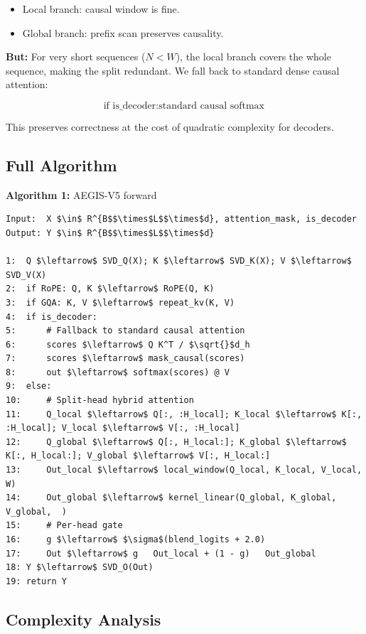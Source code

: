 \begin{itemize}
\item Local branch: causal window is fine.
\item Global branch: prefix scan preserves causality.

\end{itemize}
\textbf{But:} For very short sequences ($N < W$), the local branch covers the 
whole sequence, making the split redundant. We fall back to standard dense 
causal attention:

\begin{equation}
\text{if } \text{is\_decoder} : \text{standard causal softmax}
\end{equation}

This preserves correctness at the cost of quadratic complexity for decoders.

\subsection{Full Algorithm}

\textbf{Algorithm 1:} AEGIS-V5 forward
\begin{lstlisting}
Input:  X $\in$ R^{B$$\times$L$$\times$d}, attention_mask, is_decoder
Output: Y $\in$ R^{B$$\times$L$$\times$d}

1:  Q $\leftarrow$ SVD_Q(X); K $\leftarrow$ SVD_K(X); V $\leftarrow$ SVD_V(X)
2:  if RoPE: Q, K $\leftarrow$ RoPE(Q, K)
3:  if GQA: K, V $\leftarrow$ repeat_kv(K, V)
4:  if is_decoder:
5:      # Fallback to standard causal attention
6:      scores $\leftarrow$ Q K^T / $\sqrt{}$d_h
7:      scores $\leftarrow$ mask_causal(scores)
8:      out $\leftarrow$ softmax(scores) @ V
9:  else:
10:     # Split-head hybrid attention
11:     Q_local $\leftarrow$ Q[:, :H_local]; K_local $\leftarrow$ K[:, :H_local]; V_local $\leftarrow$ V[:, :H_local]
12:     Q_global $\leftarrow$ Q[:, H_local:]; K_global $\leftarrow$ K[:, H_local:]; V_global $\leftarrow$ V[:, H_local:]
13:     Out_local $\leftarrow$ local_window(Q_local, K_local, V_local, W)
14:     Out_global $\leftarrow$ kernel_linear(Q_global, K_global, V_global,  )
15:     # Per-head gate
16:     g $\leftarrow$ $\sigma$(blend_logits + 2.0)
17:     Out $\leftarrow$ g   Out_local + (1 - g)   Out_global
18: Y $\leftarrow$ SVD_O(Out)
19: return Y
\end{lstlisting}

\subsection{Complexity Analysis}

